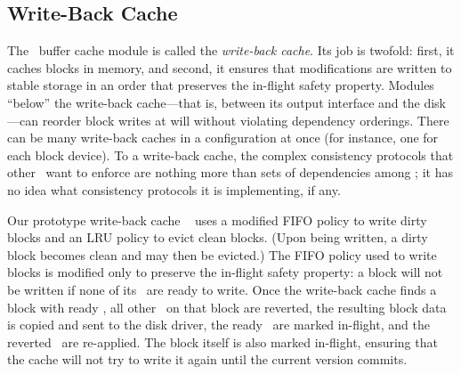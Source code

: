 
\subsection{Write-Back Cache}
\label{sec:modules:wbcache}

The \Kudos\ buffer cache module is called the \emph{write-back cache}.
%
Its job is twofold: first, it caches blocks in memory, and second, it
ensures that modifications are written to stable storage in an order that
preserves the in-flight safety property.
%
Modules ``below'' the write-back cache---that is, between its output
interface and the disk---can reorder block writes at will without violating
dependency orderings.
%
There can be many write-back caches in a configuration at once (for
instance, one for each block device). To a write-back cache, the complex
consistency protocols that other \modules\ want to enforce are nothing more
than sets of dependencies among \patches; it has no idea what consistency
protocols it is implementing, if any.

Our prototype write-back cache \module\ 
%
uses a modified FIFO policy to write dirty blocks and an LRU policy to
evict clean blocks.  (Upon being written, a dirty block becomes clean and
may then be evicted.)
%
The FIFO policy used to write blocks is modified only to preserve the
in-flight safety property: a block will not be written if none of its
\patches\ are ready to write.
%
Once the write-back cache finds a block with ready \patches, all other
\patches\ on that block are reverted, the resulting block data is copied
and sent to the disk driver, the ready \patches\ are marked in-flight, and
the reverted \patches\ are re-applied.
%
The block itself is also marked in-flight, ensuring that the cache will not
try to write it again until the current version commits.


